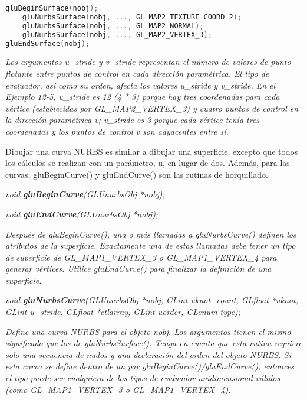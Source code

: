 \documentclass[]{article}
\begin{document}
\begin{description}
\begin{description}
{        }
\begin{lstlisting}[language=C++]
gluBeginSurface(nobj);
    gluNurbsSurface(nobj, ..., GL_MAP2_TEXTURE_COORD_2);
    gluNurbsSurface(nobj, ..., GL_MAP2_NORMAL);
    gluNurbsSurface(nobj, ..., GL_MAP2_VERTEX_3);
gluEndSurface(nobj);
\end{lstlisting}
        \item \textit{Los argumentos u\_stride y v\_stride representan el número de valores de punto flotante entre puntos de control en cada dirección paramétrica. El tipo de evaluador, así como su orden, afecta los valores u\_stride y v\_stride. En el Ejemplo 12-5, u\_stride es 12 (4 * 3) porque hay tres coordenadas para cada vértice (establecidas por GL\_MAP2\_VERTEX\_3) y cuatro puntos de control en la dirección paramétrica v; v\_stride es 3 porque cada vértice tenía tres coordenadas y los puntos de control v son adyacentes entre sí.
        }
    \end{description}
    Dibujar una curva NURBS es similar a dibujar una superficie, excepto que todos los cálculos se realizan con un parámetro, u, en lugar de dos. Además, para las curvas, gluBeginCurve() y gluEndCurve() son las rutinas de horquillado.
    \item \emph{void \textbf{gluBeginCurve}(GLUnurbsObj *nobj);}
    \item \emph{void \textbf{gluEndCurve}(GLUnurbsObj *nobj);}
    \begin{description}
        \item \textit{Después de gluBeginCurve(), una o más llamadas a gluNurbsCurve() definen los atributos de la superficie. Exactamente una de estas llamadas debe tener un tipo de superficie de GL\_MAP1\_VERTEX\_3 o GL\_MAP1\_VERTEX\_4 para generar vértices. Utilice gluEndCurve() para finalizar la definición de una superficie.
        }
    \end{description}
    \item \emph{void \textbf{gluNurbsCurve}(GLUnurbsObj *nobj, GLint uknot\_count,
    GLfloat *uknot, GLint u\_stride, GLfloat *ctlarray,
    GLint uorder, GLenum type);}
    \begin{description}
        \item \textit{Define una curva NURBS para el objeto nobj. Los argumentos tienen el mismo significado que los de gluNurbsSurface(). Tenga en cuenta que esta rutina requiere solo una secuencia de nudos y una declaración del orden del objeto NURBS. Si esta curva se define dentro de un par gluBeginCurve()/gluEndCurve(), entonces el tipo puede ser cualquiera de los tipos de evaluador unidimensional válidos (como GL\_MAP1\_VERTEX\_3 o GL\_MAP1\_VERTEX\_4).
        }
    \end{description}
\end{description}
\end{document}
